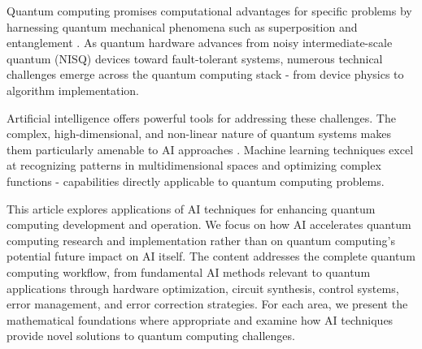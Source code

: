 Quantum computing promises computational advantages for specific problems by harnessing quantum mechanical phenomena such as superposition and entanglement \cite{alexeev2021quantum}. As quantum hardware advances from noisy intermediate-scale quantum (NISQ) devices toward fault-tolerant systems, numerous technical challenges emerge across the quantum computing stack - from device physics to algorithm implementation.

Artificial intelligence offers powerful tools for addressing these challenges. The complex, high-dimensional, and non-linear nature of quantum systems makes them particularly amenable to AI approaches \cite{dunjko2023artificial}. Machine learning techniques excel at recognizing patterns in multidimensional spaces and optimizing complex functions - capabilities directly applicable to quantum computing problems.

This article explores applications of AI techniques for enhancing quantum computing development and operation. We focus on how AI accelerates quantum computing research and implementation rather than on quantum computing's potential future impact on AI itself. The content addresses the complete quantum computing workflow, from fundamental AI methods relevant to quantum applications through hardware optimization, circuit synthesis, control systems, error management, and error correction strategies. For each area, we present the mathematical foundations where appropriate and examine how AI techniques provide novel solutions to quantum computing challenges.

